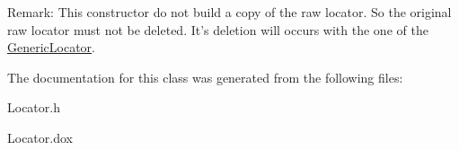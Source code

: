 \begin{DoxyParagraph}{Remark\-:}
This constructor do not build a copy of the raw locator. So the original raw locator must not be deleted. It's deletion will occurs with the one of the \hyperlink{classHurricane_1_1GenericLocator}{Generic\-Locator}. 
\end{DoxyParagraph}


The documentation for this class was generated from the following files\-:\begin{DoxyCompactItemize}
\item 
Locator.\-h\item 
Locator.\-dox\end{DoxyCompactItemize}
